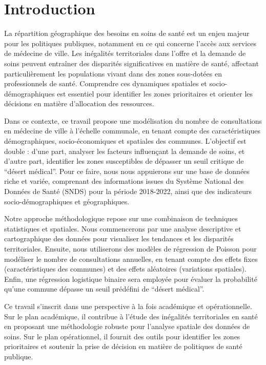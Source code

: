 \documentclass[
]{article}
\author{}
\date{\vspace{-2.5em}}
\begin{document}
\section{Introduction}\label{introduction}

La répartition géographique des besoins en soins de santé est un enjeu
majeur pour les politiques publiques, notamment en ce qui concerne
l'accès aux services de médecine de ville. Les inégalités territoriales
dans l'offre et la demande de soins peuvent entraîner des disparités
significatives en matière de santé, affectant particulièrement les
populations vivant dans des zones sous-dotées en professionnels de
santé. Comprendre ces dynamiques spatiales et socio-démographiques est
essentiel pour identifier les zones prioritaires et orienter les
décisions en matière d'allocation des ressources.

Dans ce contexte, ce travail propose une modélisation du nombre de
consultations en médecine de ville à l'échelle communale, en tenant
compte des caractéristiques démographiques, socio-économiques et
spatiales des communes. L'objectif est double : d'une part, analyser les
facteurs influençant la demande de soins, et d'autre part, identifier
les zones susceptibles de dépasser un seuil critique de ``désert
médical''. Pour ce faire, nous nous appuierons sur une base de données
riche et variée, comprenant des informations issues du Système National
des Données de Santé (SNDS) pour la période 2018-2022, ainsi que des
indicateurs socio-démographiques et géographiques.

Notre approche méthodologique repose sur une combinaison de techniques
statistiques et spatiales. Nous commencerons par une analyse descriptive
et cartographique des données pour visualiser les tendances et les
disparités territoriales. Ensuite, nous utiliserons des modèles de
régression de Poisson pour modéliser le nombre de consultations
annuelles, en tenant compte des effets fixes (caractéristiques des
communes) et des effets aléatoires (variations spatiales). Enfin, une
régression logistique binaire sera employée pour évaluer la probabilité
qu'une commune dépasse un seuil prédéfini de ``désert médical''.

Ce travail s'inscrit dans une perspective à la fois académique et
opérationnelle. Sur le plan académique, il contribue à l'étude des
inégalités territoriales en santé en proposant une méthodologie robuste
pour l'analyse spatiale des données de soins. Sur le plan opérationnel,
il fournit des outils pour identifier les zones prioritaires et soutenir
la prise de décision en matière de politiques de santé publique.
\end{document}
